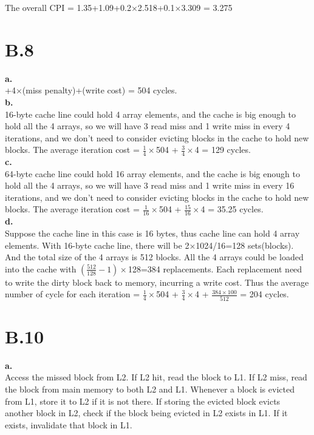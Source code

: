 \documentclass{article}
\begin{document}
\indent The overall CPI = 1.35+1.09+0.2$\times$2.518+0.1$\times$3.309 = 3.275

\section{B.8}
\indent \textbf{a.}\\
+4$\times$(miss penalty)+(write cost) = 504 cycles.\\

\noindent\textbf{b.}\\
 16-byte cache line could hold 4 array elements, and the cache is big enough to hold all the 4 arrays, so we will have 3 read miss and 1 write miss in every 4 iterations, and we don't need to consider evicting blocks in the cache to hold new blocks. The average iteration cost = $\frac{1}{4}\times$504 + $\frac{3}{4}\times$4 = 129 cycles.\\

\noindent\textbf{c.}\\
 64-byte cache line could hold 16 array elements, and the cache is big enough to hold all the 4 arrays, so we will have 3 read miss and 1 write miss in every 16 iterations, and we don't need to consider evicting blocks in the cache to hold new blocks. The average iteration cost = $\frac{1}{16}\times$504 + $\frac{15}{16}\times$4 = 35.25 cycles.\\

\noindent\textbf{d.}\\
\indent Suppose the cache line in this case is 16 bytes, thus cache line can hold 4 array elements. With 16-byte cache line, there will be 2$\times$1024/16=128 sets(blocks). And the total size of the 4 arrays is 512 blocks. All the 4 arrays could be loaded into the cache with $\left(\frac{512}{128}-1\right)\times$128=384 replacements. Each replacement need to write the dirty block back to memory, incurring a write cost. Thus the average number of cycle for each iteration = $\frac{1}{4}\times$504 + $\frac{3}{4}\times$4 + $\frac{384\times 100}{512}$ = 204 cycles.\\

\section{B.10}
\noindent \textbf{a.}\\
\indent Access the missed block from L2. If L2 hit, read the block to L1. If L2 miss, read the block from main memory to both L2 and L1. Whenever a block is evicted from L1, store it to L2 if it is not there. If storing the evicted block evicts another block in L2, check if the block being evicted in L2 exists in L1. If it exists, invalidate that block in L1.
\end{document}
